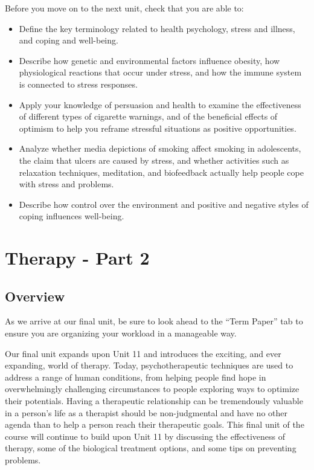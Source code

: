 \documentclass[
]{book}
\begin{document}
\begin{progress}
Before you move on to the next unit, check that you are able to:

\begin{itemize}
\item
  Define the key terminology related to health psychology, stress and illness, and coping and well-being.
\item
  Describe how genetic and environmental factors influence obesity, how physiological reactions that occur under stress, and how the immune system is connected to stress responses.
\item
  Apply your knowledge of persuasion and health to examine the effectiveness of different types of cigarette warnings, and of the beneficial effects of optimism to help you reframe stressful situations as positive opportunities.
\item
  Analyze whether media depictions of smoking affect smoking in adolescents, the claim that ulcers are caused by stress, and whether activities such as relaxation techniques, meditation, and biofeedback actually help people cope with stress and problems.
\item
  Describe how control over the environment and positive and negative styles of coping influences well-being.
\end{itemize}
\end{progress}

\hypertarget{therapy---part-2}{%
\chapter{Therapy - Part 2}\label{therapy---part-2}}

\hypertarget{overview-10}{%
\section*{Overview}\label{overview-10}}

As we arrive at our final unit, be sure to look ahead to the ``Term Paper'' tab to ensure you are organizing your workload in a manageable way.

Our final unit expands upon Unit 11 and introduces the exciting, and ever expanding, world of therapy. Today, psychotherapeutic techniques are used to address a range of human conditions, from helping people find hope in overwhelmingly challenging circumstances to people exploring ways to optimize their potentials. Having a therapeutic relationship can be tremendously valuable in a person's life as a therapist should be non-judgmental and have no other agenda than to help a person reach their therapeutic goals. This final unit of the course will continue to build upon Unit 11 by discussing the effectiveness of therapy, some of the biological treatment options, and some tips on preventing problems.
\end{document}
